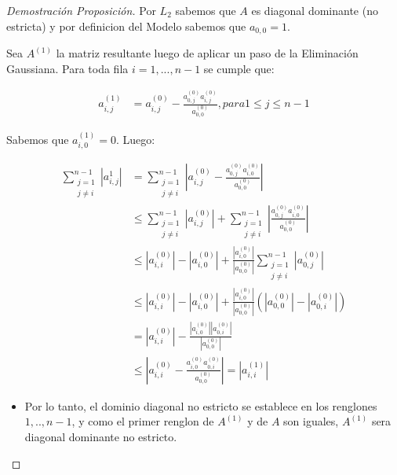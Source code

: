 \begin{proof}[Demostración Proposición]

Por $L_{2}$ sabemos que $A$ es diagonal dominante (no estricta) y por definicion del Modelo sabemos que $a_{0,0} = 1$.

Sea $A^{(1)}$ la matriz resultante luego de aplicar un paso de la Eliminación Gaussiana. Para toda fila $i = 1,...,n-1$ se cumple que:

\begin{equation*}
    \begin{aligned}
      a^{(1)}_{i,j} &= a^{(0)}_{i,j} - \frac{a^{(0)}_{0,j}a^{(0)}_{i,j}}{a^{(0)}_{0,0}}, para 1 \leq j \leq n-1
    \end{aligned}
\end{equation*}

Sabemos que $a^{(1)}_{i,0} = 0$. Luego:

\begin{equation*}
    \begin{aligned}
      \sum\limits_{\substack{j=1  \\ j \neq i}}^{n-1} |a^{1}_{i,j}| &= \sum\limits_{\substack{j=1  \\ j \neq i}}^{n-1} |a^{(0)}_{i,j} - \frac{a^{(0)}_{0,j}a^{(0)}_{i,0}}{a^{(0)}_{0,0}}| \\
      &\leq \sum\limits_{\substack{j=1  \\ j \neq i}}^{n-1} |a^{(0)}_{i,j}| + \sum\limits_{\substack{j=1  \\ j \neq i}}^{n-1} |\frac{a^{(0)}_{0,j}a^{(0)}_{i,0}}{a^{(0)}_{0,0}}| \\
      &\leq |a^{(0)}_{i,i}| - |a^{(0)}_{i,0}| +  \frac{|a^{(0)}_{i,0}|}{|a^{(0)}_{0,0}|} \sum\limits_{\substack{j=1  \\ j \neq i}}^{n-1} |a^{(0)}_{0,j}| \\
      &\leq |a^{(0)}_{i,i}| - |a^{(0)}_{i,0}| +  \frac{|a^{(0)}_{i,0}|}{|a^{(0)}_{0,0}|} (|a^{(0)}_{0,0}| - |a^{(0)}_{0,i}|) \\
      &= |a^{(0)}_{i,i}| - \frac{|a^{(0)}_{i,0}||a^{(0)}_{0,i}|}{|a^{(0)}_{0,0}|} \\
      &\leq |a^{(0)}_{i,i} - \frac{a^{(0)}_{i,0}a^{(0)}_{0,i}}{a^{(0)}_{0,0}}| = |a^{(1)}_{i,i}|
    \end{aligned}
\end{equation*}

\begin{itemize}


\item Por lo tanto, el dominio diagonal no estricto se establece en los renglones $1,..,n-1$, y como el primer renglon de $A^{(1)}$ y de $A$ son iguales,
$A^{(1)}$ sera diagonal dominante no estricto. 


\end{itemize}
\end{proof}
